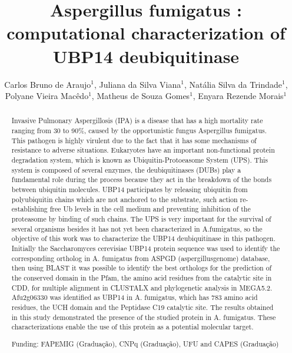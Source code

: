 \documentclass[twoside]{article}
\title{\vspace{-15mm}\fontsize{24pt}{10pt}\selectfont\textbf{Aspergillus fumigatus : computational characterization of  UBP14 deubiquitinase}} %
\author{Carlos Bruno de Araujo$^1$, Juliana da Silva Viana$^1$, Nat\'alia Silva da Trindade$^1$, Polyane Vieira Mac\^edo$^1$, Matheus de Souza Gomes$^1$, Enyara Rezende Morais$^1$}
\affil{1 UFU\\ }
\date{}
\begin{document}
\maketitle %

\thispagestyle{fancy} %


\begin{abstract}
Invasive Pulmonary Aspergillosis (IPA) is a disease that has a high mortality rate ranging from 30 to 90\%, caused by the opportunistic fungus Aspergillus fumigatus. This pathogen is highly virulent due to the fact that it has some mechanisms of resistance to adverse situations. Eukaryotes have an important non-functional protein degradation system, which is known as Ubiquitin-Protoeasome System (UPS). This system is composed of several enzymes, the deubiquitinases (DUBs) play a fundamental role during the process because they act in the breakdown of the bonds between ubiquitin molecules. UBP14 participates by releasing ubiquitin from polyubiquitin chains which are not anchored to the substrate, such action re-establishing free Ub levels in the cell medium and preventing inhibition of the proteasome by binding of such chains. The UPS is very important for the survival of several organisms besides it has not yet been characterized in A.fumigatus, so the objective of this work was to characterize the UBP14 deubiquitinase in this pathogen. Initially the Saccharomyces cerevisiae UBP14 protein sequence was used to identify the corresponding ortholog in A. fumigatus from ASPGD (aspergillusgenome) database, then using BLAST it was possible to identify the best orthologs for the prediction of the conserved domain in the Pfam, the amino acid residues from the catalytic site in CDD, for multiple alignment in CLUSTALX and phylogenetic analysis in MEGA5.2. Afu2g06330 was identified as UBP14 in A. fumigatus, which has 783 amino acid residues, the UCH domain and the Peptidase C19 catalytic site. The results obtained in this study demonstrated the presence of the studied protein in A. fumigatus. These characterizations enable the use of this protein as a potential molecular target.

Funding: FAPEMIG (Gradua\c{c}\~ao), CNPq (Gradua\c{c}\~ao), UFU and CAPES (Gradua\c{c}\~ao)
\end{abstract}
\end{document}
